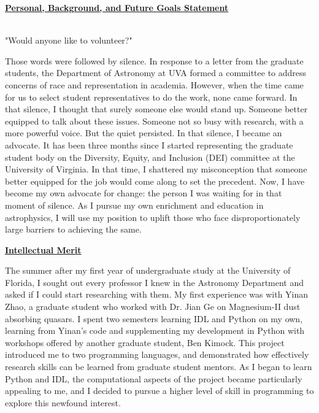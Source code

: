 \documentclass[11pt]{article}
\title{\vspace{-1.5in}}
\author{}
\date{}
\begin{document}
\maketitle

\thispagestyle{empty}
\centerline{\underline{\textbf{Personal, Background, and Future Goals Statement}}}


\hspace{0.5cm}\\
"Would anyone like to volunteer?"

Those words were followed by silence. In response to a letter from the graduate students, the Department of Astronomy at UVA formed a committee to address concerns of race and representation in academia. However, when the time came for us to select student representatives to do the work, none came forward. In that silence, I thought that surely someone else would stand up. Someone better equipped to talk about these issues. Someone not so busy with research, with a more powerful voice. But the quiet persisted. In that silence, I became an advocate. It has been three months since I started representing the graduate student body on the Diversity, Equity, and Inclusion (DEI) committee at the University of Virginia. In that time, I shattered my misconception that someone better equipped for the job would come along to set the precedent. Now, I have become my own advocate for change: the person I was waiting for in that moment of silence. As I pursue my own enrichment and education in astrophysics, I will use my position to uplift those who face disproportionately large barriers to achieving the same.

\noindent \textbf{\underline{Intellectual Merit}}

The summer after my first year of undergraduate study at the University of Florida, I sought out every professor I knew in the Astronomy Department and asked if I could start researching with them. My first experience was with Yinan Zhao, a graduate student who worked with Dr. Jian Ge on Magnesium-II dust absorbing quasars. I spent two semesters learning IDL and Python on my own, learning from Yinan's code and supplementing my development in Python with workshops offered by another graduate student, Ben Kimock. This project introduced me to two programming languages, and demonstrated how effectively research skills can be learned from graduate student mentors. As I began to learn Python and IDL, the computational aspects of the project became particularly appealing to me, and I decided to pursue a higher level of skill in programming to explore this newfound interest.
\end{document}
